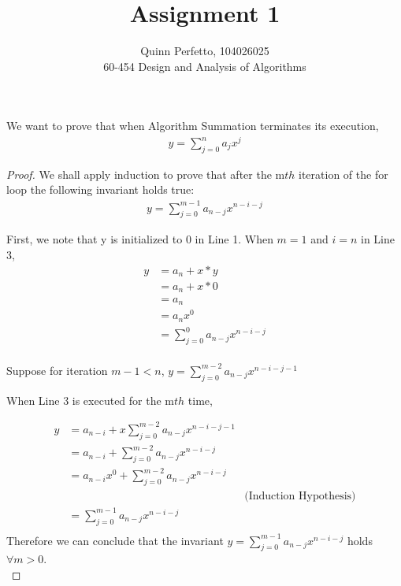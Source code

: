 \documentclass[12pt]{article}
\newenvironment{question}[2][Question]{\begin{trivlist}
\item[\hskip \labelsep {\bfseries #1}\hskip \labelsep {\bfseries #2.}]}{\end{trivlist}}
\begin{document}
\title{Assignment 1}%
\author{Quinn Perfetto, 104026025\\ %
 60-454 Design and Analysis of Algorithms} %

\maketitle

\begin{question}{1. (i)}
  We want to prove that when Algorithm Summation terminates its execution,
  \begin{align*}
    \texttt{$y = \sum_{j=0}^{n} a_{j}x^{j}$}
  \end{align*}
  \begin{proof}
    We shall apply induction to prove that after the m$th$ iteration of the
    for loop the following invariant holds true:
    \begin{align*}
      \texttt{$y = \sum_{j=0}^{m - 1} a_{n - j}x^{n - i - j}$}
    \end{align*}

    First, we note that y is initialized to 0 in Line 1. When $m=1$ and $i=n$
    in Line 3,
    \begin{align*}
      y & = a_{n} + x * y\\
        & = a_{n} + x * 0\\
        & = a_{n}\\
        & = a_{n}x^{0}\\
        & = \sum_{j=0}^{0} a_{n - j}x^{n - i - j}\\
    \end{align*}

    Suppose for iteration $m - 1 < n$,
    $y = \sum_{j=0}^{m-2} a_{n - j}x^{n - i - j - 1}$

    When Line 3 is executed for the m$th$ time,

    \begin{align*}
      y & = a_{n - i} + x\sum_{j=0}^{m-2} a_{n - j}x^{n - i - j - 1}\\
        & = a_{n - i} + \sum_{j=0}^{m-2} a_{n - j}x^{n - i - j} \\
        & = a_{n - i}x^{0} + \sum_{j=0}^{m-2} a_{n - j}x^{n - i - j}\\
        & & \text{(Induction Hypothesis)}\\
        & = \sum_{j=0}^{m-1} a_{n-j}x^{n - i - j}\\
    \end{align*}
    Therefore we can conclude that the invariant
    \texttt{$y = \sum_{j=0}^{m - 1} a_{n - j}x^{n - i - j}$} holds $\forall m > 0$. \\



\end{proof}
\end{question}
\end{document}
